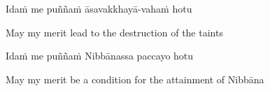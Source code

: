 Idaṁ me puññaṁ āsavakkhayā-vahaṁ hotu

\begin{english}
  May my merit lead to the destruction of the taints
\end{english}

Idaṁ me puññaṁ Nibbānassa paccayo hotu

\begin{english}
  May my merit be a condition for the attainment of Nibbāna
\end{english}



\endgroup
